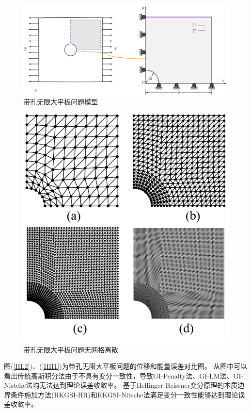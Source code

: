 \begin{figure}[H]
\centering
\includegraphics[scale=0.5]{figure/E/hole/hole.png}
    \caption{带孔无限大平板问题模型}\label{hole}
\end{figure}
\begin{figure}
\centering
 \includegraphics[scale=0.7]{figure/E/hole/hole.msh.png}
   \caption{带孔无限大平板问题无网格离散}\label{hole.msh}
\end{figure}
图(\ref{HL2})、(\ref{HH1})为带孔无限大平板问题的位移和能量误差对比图。
从图中可以看出传统高斯积分法由于不具有变分一致性，导致GI-Penalty法、GI-LM法、GI-Nistche法均无法达到理论误差收敛率。
基于Hellinger-Reissner变分原理的本质边界条件施加方法(RKGSI-HR)和RKGSI-Nitsche法满足变分一致性能够达到理论误差收敛率。

